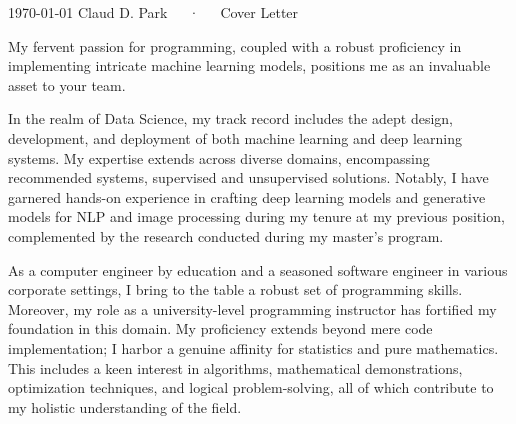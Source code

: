 \documentclass[11pt, a4paper]{awesome-cv}
\begin{document}
\makecvheader[R]

\makecvfooter
  {\today}
  {Claud D. Park~~~·~~~Cover Letter}
  {}

\makelettertitle

\begin{cvletter}



My fervent passion for programming, coupled with a robust proficiency in implementing intricate machine learning models, positions me as an invaluable asset to your team.

In the realm of Data Science, my track record includes the adept design, development, and deployment of both machine learning and deep learning systems. My expertise extends across diverse domains, encompassing recommended systems, supervised and unsupervised solutions. Notably, I have garnered hands-on experience in crafting deep learning models and generative models for NLP and image processing during my tenure at my previous position, complemented by the research conducted during my master's program.

As a computer engineer by education and a seasoned software engineer in various corporate settings, I bring to the table a robust set of programming skills. Moreover, my role as a university-level programming instructor has fortified my foundation in this domain. My proficiency extends beyond mere code implementation; I harbor a genuine affinity for statistics and pure mathematics. This includes a keen interest in algorithms, mathematical demonstrations, optimization techniques, and logical problem-solving, all of which contribute to my holistic understanding of the field.

\end{cvletter}


\makeletterclosing
\end{document}
